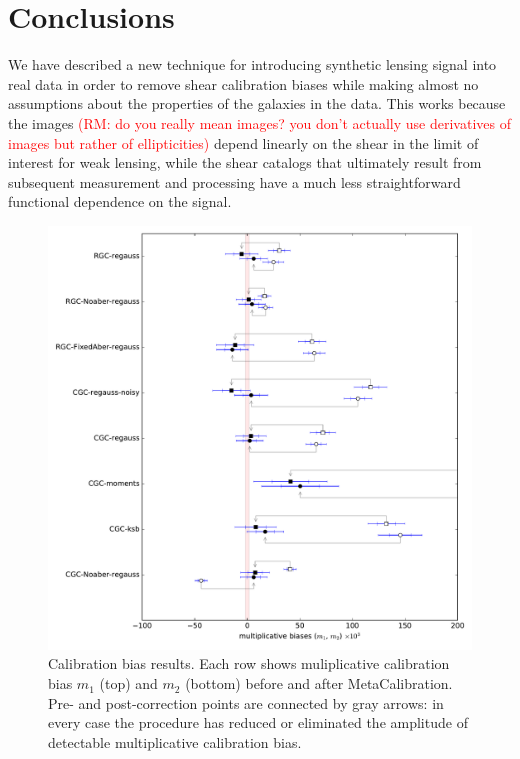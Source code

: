 \documentclass[iop]{emulateapj}
\newcommand\rmcomment[1]{\textcolor{red}{(RM: #1)}}
\begin{document}
\section{Conclusions}
We have described a new technique for introducing synthetic lensing
signal into real data in order to 
remove shear calibration biases while making almost no assumptions
about the properties of the galaxies in the data. This works because
the images \rmcomment{do you really mean images?  you don't actually use derivatives of images but
  rather of ellipticities} depend linearly on the shear in the limit of interest for
weak lensing, while the shear catalogs that ultimately result from
subsequent measurement and processing have a much less straightforward
functional dependence on the signal.

\begin{figure}[t]
\begin{center}
\includegraphics[width=0.8\linewidth]{./Plots/m_results_linear.pdf}
\end{center}
\caption{Calibration bias results. Each row shows muliplicative
  calibration bias $m_1$ (top) and $m_2$ (bottom) before and after
  MetaCalibration. Pre- and post-correction points are connected by
  gray arrows: in every case the procedure has reduced or eliminated
  the amplitude of detectable multiplicative calibration bias.}
\end{figure}
\end{document}

